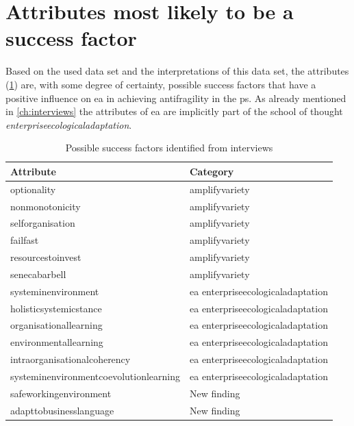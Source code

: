 \section{Attributes most likely to be a success factor}
\label{sec:attributeslikelysf}
Based on the used data set and the interpretations of this data set, the attributes (\cref{tab:interviewpossiblesf}) are, with some degree of certainty, possible success factors that have a positive influence on \acrshort{ea} in achieving \gls{antifragility} in the \gls{ps}. As already mentioned in \cref{ch:interviews} the attributes of \acrshort{ea} are implicitly part of the school of thought \textit{\gls{enterpriseecologicaladaptation}}.
\begin{table}[H]
	\begin{center}
			\begin{tabular}{@{}ll@{}}
				\toprule%
				\textbf{Attribute} & \textbf{Category}  \\%
				\midrule%
				\Gls{optionality} & \Gls{amplifyvariety} \\%
				\Gls{nonmonotonicity} & \Gls{amplifyvariety} \\%
				\Gls{selforganisation} & \Gls{amplifyvariety} \\%
				\Gls{failfast} & \Gls{amplifyvariety} \\%
				\Gls{resourcestoinvest} & \Gls{amplifyvariety} \\%
				\Gls{senecabarbell} & \Gls{amplifyvariety} \\%
				\Gls{systeminenvironment} & \acrshort{ea} \Gls{enterpriseecologicaladaptation} \\%
				\Gls{holisticsystemicstance} & \acrshort{ea} \Gls{enterpriseecologicaladaptation} \\%
				\Gls{organisationallearning} & \acrshort{ea} \Gls{enterpriseecologicaladaptation} \\%
				\Gls{environmentallearning} & \acrshort{ea} \Gls{enterpriseecologicaladaptation} \\%
				\Gls{intraorganisationalcoherency} & \acrshort{ea} \Gls{enterpriseecologicaladaptation} \\%
				\Gls{systeminenvironmentcoevolutionlearning} & \acrshort{ea} \Gls{enterpriseecologicaladaptation} \\%
				\Gls{safeworkingenvironment} & New finding \\%
				\Gls{adapttobusinesslanguage} & New finding \\%
				\bottomrule%
			\end{tabular}
		\caption{Possible success factors identified from interviews}
		\label{tab:interviewpossiblesf}
	\end{center}
\end{table}

